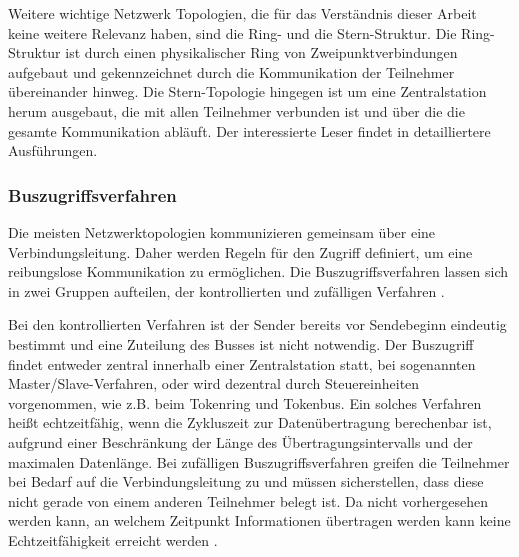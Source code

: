 Weitere wichtige Netzwerk Topologien, die für das Verständnis dieser Arbeit keine weitere Relevanz haben, sind die Ring- und die Stern-Struktur.
Die Ring-Struktur ist durch einen physikalischer Ring von Zweipunktverbindungen aufgebaut und gekennzeichnet durch die Kommunikation der Teilnehmer übereinander hinweg. Die Stern-Topologie hingegen ist um eine Zentralstation herum ausgebaut, die mit allen Teilnehmer verbunden ist und über die die gesamte Kommunikation abläuft. Der interessierte Leser findet in \cite[S.~6f.]{schn06} detailliertere Ausführungen.

\subsubsection{Buszugriffsverfahren}
Die meisten Netzwerktopologien kommunizieren gemeinsam über eine Verbindungsleitung. Daher werden Regeln für den Zugriff definiert, um eine reibungslose Kommunikation zu ermöglichen. Die Buszugriffsverfahren lassen sich in zwei Gruppen aufteilen, der kontrollierten und zufälligen Verfahren \cite[S.~19]{schn06}.

Bei den kontrollierten Verfahren ist der Sender bereits vor Sendebeginn eindeutig bestimmt und eine Zuteilung des Busses ist nicht notwendig. Der Buszugriff findet entweder zentral innerhalb einer Zentralstation statt, bei sogenannten Master/Slave-Verfahren, oder wird dezentral durch Steuereinheiten vorgenommen, wie z.B. beim Tokenring und Tokenbus. Ein solches Verfahren heißt echtzeitfähig, wenn die Zykluszeit zur Datenübertragung berechenbar ist, aufgrund einer Beschränkung der Länge des Übertragungsintervalls und der maximalen Datenlänge.
Bei zufälligen Buszugriffsverfahren greifen die Teilnehmer bei Bedarf auf die Verbindungsleitung zu und müssen sicherstellen, dass diese nicht gerade von einem anderen Teilnehmer belegt ist. Da nicht vorhergesehen werden kann, an welchem Zeitpunkt Informationen übertragen werden kann keine Echtzeitfähigkeit erreicht werden \cite[S.~19]{schn06}.

